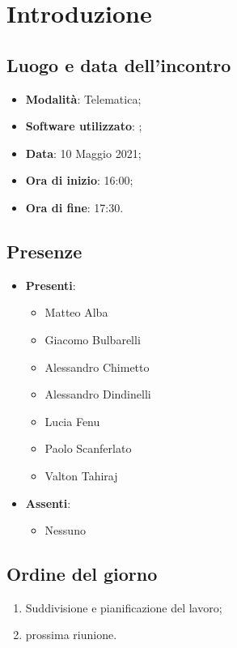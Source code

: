 \documentclass[]{article}
\begin{document}
	

	\newpage


		\section{Introduzione}
		\subsection{Luogo e data dell'incontro}
		\begin{itemize}
			\item \textbf{Modalità}: Telematica;
			\item \textbf{Software utilizzato}: ;
			\item \textbf{Data}: 10 Maggio 2021;
			\item \textbf{Ora di inizio}: 16:00;
			\item \textbf{Ora di fine}: 17:30.
		\end{itemize}

		\subsection{Presenze}
		\begin{itemize}
			\item \textbf{Presenti}:
			\begin{itemize}
				\item Matteo Alba
				\item Giacomo Bulbarelli
				\item Alessandro Chimetto
				\item Alessandro Dindinelli
				\item Lucia Fenu
				\item Paolo Scanferlato
				\item Valton Tahiraj
			\end{itemize}
			\item \textbf{Assenti}:
			\begin{itemize}
				\item Nessuno
			\end{itemize}
		\end{itemize}


		\subsection{Ordine del giorno}
		\begin{enumerate}
			\item Suddivisione e pianificazione del lavoro;
			\item prossima riunione.
		\end{enumerate}
\end{document}
